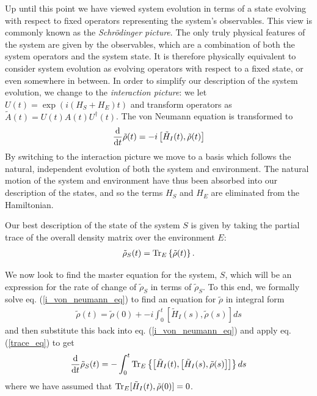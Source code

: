Up until this point we have viewed system evolution in terms of a state evolving with respect to fixed operators representing the system's observables. This view is commonly known as the \textit{Schr\"odinger picture}. The only truly physical features of the system are given by the observables, which are a combination of both the system operators and the system state. It is therefore physically equivalent to consider system evolution as evolving operators with respect to a fixed state, or even somewhere in between. In order to simplify our description of the system evolution, we change to the \textit{interaction picture}: we let $U(t) = \exp(i(H_S + H_E)t)$ and transform operators as $\tilde{A}(t) = U(t)A(t)U^\dagger(t)$. The von Neumann equation is transformed to
\begin{align}
  \label{i_von_neumann_eq}
  \frac{\mathrm{d}}{\mathrm{d}t} \tilde{\rho}(t) = -i\left[ \tilde{H}_I(t), \tilde{\rho}(t) \right]
\end{align}
By switching to the interaction picture we move to a basis which follows the natural, independent evolution of both the system and environment. The natural motion of the system and environment have thus been absorbed into our description of the states, and so the terms $H_S$ and $H_E$ are eliminated from the Hamiltonian.

Our best description of the state of the system $S$ is given by taking the partial trace of the overall density matrix over the environment $E$:
\begin{align}
  \label{trace_eq}
  \tilde{\rho}_S(t) = \operatorname{Tr}_E\left\{\tilde{\rho}(t)\right\}.
\end{align}

We now look to find the master equation for the system, $S$, which will be an expression for the rate of change of $\tilde{\rho}_S$ in terms of $\tilde{\rho}_S$. To this end, we formally solve eq. (\ref{i_von_neumann_eq}) to find an equation for $\tilde{\rho}$ in integral form
\begin{align}
  \tilde{\rho}(t) = \tilde{\rho}(0) + -i\int_{0}^t \left[ \tilde{H}_I(s), \tilde{\rho}(s) \right] ds
\end{align}
and then substitute this back into eq. (\ref{i_von_neumann_eq}) and apply eq. (\ref{trace_eq}) to get
\begin{align}
  \label{before_markov_approx}
  \frac{\mathrm{d}}{\mathrm{d}t} \tilde{\rho}_S(t) = -\int_{0}^t \operatorname{Tr}_E\left\{ \left[ \tilde{H}_I(t), \left[ \tilde{H}_I(s), \tilde{\rho}(s) \right] \right] \right\} ds
\end{align}
where we have assumed that $\operatorname{Tr}_E [\tilde{H}_I(t), \tilde{\rho}(0)] = 0$.

